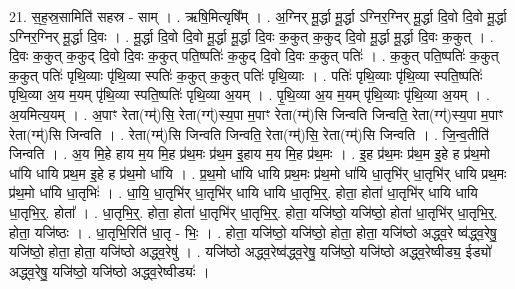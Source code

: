 \documentclass[17pt]{extarticle}
\begin{document}
21. स॒ह॒स्र॒सामिति॑ सहस्र - साम् । . ऋषि॒मित्यृषि᳚म् । . अ॒ग्निर् मू॒र्द्धा मू॒र्द्धा ऽग्निर॒ग्निर् मू॒र्द्धा दि॒वो दि॒वो मू॒र्द्धा ऽग्निर॒ग्निर् मू॒र्द्धा दि॒वः । . मू॒र्द्धा दि॒वो दि॒वो मू॒र्द्धा मू॒र्द्धा दि॒वः क॒कुत् क॒कुद् दि॒वो मू॒र्द्धा मू॒र्द्धा दि॒वः क॒कुत् । . दि॒वः क॒कुत् क॒कुद् दि॒वो दि॒वः क॒कुत् पति॒ष्पतिः॑ क॒कुद् दि॒वो दि॒वः क॒कुत् पतिः॑ । . क॒कुत् पति॒ष्पतिः॑ क॒कुत् क॒कुत् पतिः॑ पृथि॒व्याः पृ॑थि॒व्या स्पतिः॑ क॒कुत् क॒कुत् पतिः॑ पृथि॒व्याः । . पतिः॑ पृथि॒व्याः पृ॑थि॒व्या स्पति॒ष्पतिः॑ पृथि॒व्या अ॒य म॒यम् पृ॑थि॒व्या स्पति॒ष्पतिः॑ पृथि॒व्या अ॒यम् । . पृ॒थि॒व्या अ॒य म॒यम् पृ॑थि॒व्याः पृ॑थि॒व्या अ॒यम् । . अ॒यमित्य॒यम् । . अ॒पाꣳ रेता(ग्म्॑)सि॒ रेता(ग्ग्॑)स्य॒पा म॒पाꣳ रेता(ग्म्॑)सि जिन्वति जिन्वति॒ रेता(ग्ग्॑)स्य॒पा म॒पाꣳ रेता(ग्म्॑)सि जिन्वति । . रेता(ग्म्॑)सि जिन्वति जिन्वति॒ रेता(ग्म्॑)सि॒ रेता(ग्म्॑)सि जिन्वति । . जि॒न्व॒तीति॑ जिन्वति । . अ॒य मि॒हे हाय म॒य मि॒ह प्र॑थ॒मः प्र॑थ॒म इ॒हाय म॒य मि॒ह प्र॑थ॒मः । . इ॒ह प्र॑थ॒मः प्र॑थ॒म इ॒हे ह प्र॑थ॒मो धा॑यि धायि प्रथ॒म इ॒हे ह प्र॑थ॒मो धा॑यि । . प्र॒थ॒मो धा॑यि धायि प्रथ॒मः प्र॑थ॒मो धा॑यि धा॒तृभि॑र् धा॒तृभि॑र् धायि प्रथ॒मः प्र॑थ॒मो धा॑यि धा॒तृभिः॑ । . धा॒यि॒ धा॒तृभि॑र् धा॒तृभि॑र् धायि धायि धा॒तृभि॒र्॒. होता॒ होता॑ धा॒तृभि॑र् धायि धायि धा॒तृभि॒र्॒. होता᳚ । . धा॒तृभि॒र्॒. होता॒ होता॑ धा॒तृभि॑र् धा॒तृभि॒र्॒. होता॒ यजि॑ष्ठो॒ यजि॑ष्ठो॒ होता॑ धा॒तृभि॑र् धा॒तृभि॒र्॒. होता॒ यजि॑ष्ठः । . धा॒तृभि॒रिति॑ धा॒तृ - भिः॒ । . होता॒ यजि॑ष्ठो॒ यजि॑ष्ठो॒ होता॒ होता॒ यजि॑ष्ठो अद्ध्व॒रे ष्व॑द्ध्व॒रेषु॒ यजि॑ष्ठो॒ होता॒ होता॒ यजि॑ष्ठो अद्ध्व॒रेषु॑ । . यजि॑ष्ठो अद्ध्व॒रेष्व॑द्ध्व॒रेषु॒ यजि॑ष्ठो॒ यजि॑ष्ठो अद्ध्व॒रेष्वीड्य॒ ईड्यो॑ अद्ध्व॒रेषु॒ यजि॑ष्ठो॒ यजि॑ष्ठो अद्ध्व॒रेष्वीड्यः॑ । \newline
\end{document}
